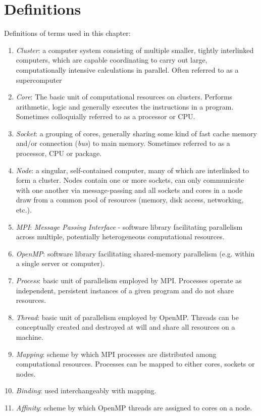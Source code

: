 \documentclass{report}
\begin{document}
\section{Definitions}
\label{sec:definitions}
Definitions of terms used in this chapter:
\begin{enumerate}
\item \textit{Cluster}: a computer system consisting of multiple smaller, tightly interlinked computers, 
which are capable coordinating to carry out large, computationally intensive calculations in parallel.
Often referred to as a supercomputer
\item \textit{Core}: The basic unit of computational resources on clusters. Performs arithmetic, logic 
and generally executes the instructions in a program. Sometimes colloquially referred to as a processor 
or CPU.
\item \textit{Socket}: a grouping of cores, generally sharing some kind of fast cache memory and/or 
connection (\textit{bus}) to main memory. Sometimes referred to as a processor, CPU or package.
\item \textit{Node}: a singular, self-contained computer, many of which are interlinked to form a 
cluster. Nodes contain one or more sockets, can only communicate with one another via message-passing 
and all sockets and cores in a node draw from a common pool of resources (memory, disk access, 
networking, etc.).

\item \textit{MPI}: \textit{Message Passing Interface} - software library facilitating parallelism 
across multiple, potentially heterogeneous computational resources.
\item \textit{OpenMP}: software library facilitating shared-memory parallelism (e.g. within a single 
server or computer).
\item \textit{Process}: basic unit of parallelism employed by MPI. Processes operate as independent, 
persistent instances of a given program and do not share resources.
\item \textit{Thread}: basic unit of parallelism employed by OpenMP. Threads can be conceptually created 
and destroyed at will and share all resources on a machine.

\item \textit{Mapping}: scheme by which MPI processes are distributed among computational resources. 
Processes can be mapped to either cores, sockets or nodes.
\item \textit{Binding}: used interchangeably with mapping.
\item \textit{Affinity}: scheme by which OpenMP threads are assigned to cores on a node.

\end{enumerate}
\end{document}
